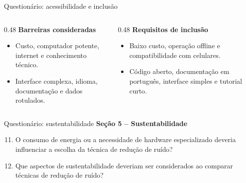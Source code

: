 \documentclass[aspectratio=1610,11pt]{beamer}
\begin{document}
{\begin{frame}[noframenumbering]{Questionário: acessibilidade e inclusão}
    \vspace{0.2cm}
    \begin{columns}[T,onlytextwidth]
        \begin{column}{0.48\textwidth}
            \textbf{Barreiras consideradas}
            \begin{itemize}
                \item Custo, computador potente, internet e conhecimento técnico.
                \item Interface complexa, idioma, documentação e dados rotulados.
            \end{itemize}
        \end{column}
        \begin{column}{0.48\textwidth}
            \textbf{Requisitos de inclusão}
            \begin{itemize}
                \item Baixo custo, operação offline e compatibilidade com celulares.
                \item Código aberto, documentação em português, interface simples e tutorial curto.
            \end{itemize}
        \end{column}
    \end{columns}
\end{frame}

\begin{frame}[noframenumbering]{Questionário: sustentabilidade}
    \footnotesize
    \textbf{Seção 5 -- Sustentabilidade}
    \begin{enumerate}
        \setcounter{enumi}{10}
        \item O consumo de energia ou a necessidade de hardware especializado deveria influenciar a escolha da técnica de redução de ruído?
        \item Que aspectos de sustentabilidade deveriam ser considerados ao comparar técnicas de redução de ruído?
    \end{enumerate}


\end{frame}}
\end{document}

